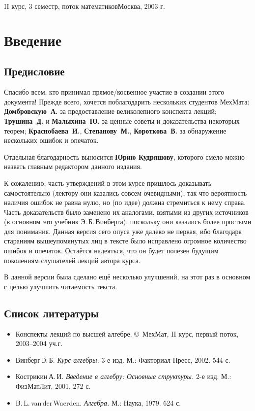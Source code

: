 \documentclass[a4paper]{article}
\begin{document}
{II курс, 3 семестр, поток математиков}{Москва, 2003 г.}

\pagebreak
\tableofcontents
\pagebreak

\section*{Введение}
\subsection*{Предисловие}

Спасибо всем, кто принимал прямое/косвенное участие в создании этого документа! Прежде всего, хочется
поблагодарить нескольких студентов МехМата: \textbf{Домбровскую~А.} за предоставление великолепного
конспекта лекций; \textbf{Трушина~Д.} и \textbf{Малыхина~Ю.} за ценные советы и доказательства некоторых
теорем; \textbf{Краснобаева~И.}, \textbf{Степанову~М.}, \textbf{Короткова~В.} за обнаружение
нескольких ошибок и опечаток.

Отдельная благодарность выносится \textbf{Юрию Кудряшову}, которого смело можно назвать главным редактором
данного издания.

К сожалению, часть утверждений в этом курсе пришлось доказывать самостоятельно (лектору они казались совсем
очевидными), так что вероятность наличия ошибок не равна нулю, но (по идее) должна стремиться к нему справа.
Часть доказательств было заменено их аналогами, взятыми из других источников (в основном это учебник
Э.\,Б.\,Винберга), поскольку они казались более простыми для понимания. Данная версия сего опуса уже далеко
не первая, ибо благодаря стараниям вышеупомянутых лиц в тексте было исправлено огромное количество ошибок и
опечаток. Остаётся надеяться, что он будет полезен будущим поколениям слушателей лекций автора курса.

В данной версии была сделано ещё несколько улучшений, на этот раз в основном с целью улучшить читаемость текста.

\subsection*{Список литературы}

\begin{itemize}
\setlength{\itemsep}{-3pt}

\item Конспекты лекций по высшей алгебре. \copyright \, МехМат, II курс, первый поток, 2003--2004 уч.г.
\item Винберг\,Э.\,Б. \emph{Курс алгебры.} 3-е изд. М.: Факториал-Пресс, 2002. 544 с.
\item Кострикин\,А.\,И. \emph{Введение в алгебру: Основные структуры.} 2-е изд. М.: ФизМатЛит, 2001. 272 с.
\item B.\,L.\,van\,der\,Waerden. \emph{Алгебра.} М.: Наука, 1979. 624 с.
\end{itemize}
\end{document}
